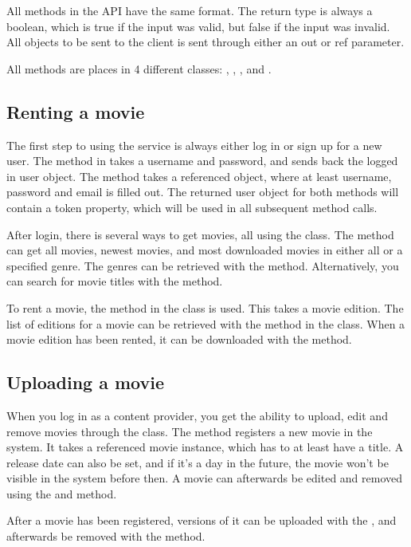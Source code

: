 All methods in the API have the same format. The return type is always a boolean, which is true if the input was valid, but false if the input was invalid. All objects to be sent to the client is sent through either an out or ref parameter.

All methods are places in 4 different classes: , , , and .

\subsection{Renting a movie}
\label{Manual_Service_Usage_Rent}
The first step to using the service is always either log in or sign up for a new user. The  method in  takes a username and password, and sends back the logged in user object. The  method takes a referenced  object, where at least username, password and email is filled out. The returned user object for both methods will contain a token property, which will be used in all subsequent method calls.

After login, there is several ways to get movies, all using the  class. The  method can get all movies, newest movies, and most downloaded movies in either all or a specified genre. The genres can be retrieved with the  method. Alternatively, you can search for movie titles with the  method.

To rent a movie, the  method in the  class is used. This takes a movie edition. The list of editions for a movie can be retrieved with the  method in the  class. When a movie edition has been rented, it can be downloaded with the  method.

\subsection{Uploading a movie}
\label{Manual_Service_Usage_Upload}
When you log in as a content provider, you get the ability to upload, edit and remove movies through the  class. The  method registers a new movie in the system. It takes a referenced movie instance, which has to at least have a title. A release date can also be set, and if it's a day in the future, the movie won't be visible in the system before then. A movie can afterwards be edited and removed using the  and  method.

After a movie has been registered, versions of it can be uploaded with the , and afterwards be removed with the  method.
